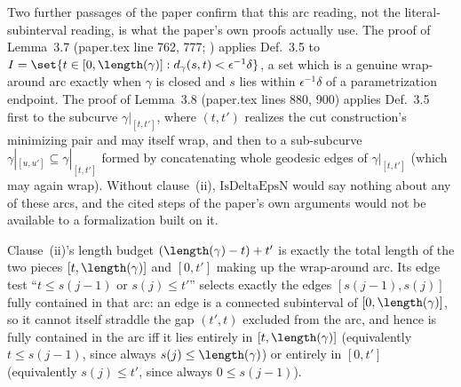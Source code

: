 \begin{definition}
  Two further passages of the paper confirm that this arc reading, not the literal-subinterval
  reading, is what the paper's own proofs actually use. The proof of Lemma~3.7 (paper.tex line 762,
  777; ) applies Def.~3.5 to $I = \set{t\in[0,\length(\gamma)] :
  d_\gamma(s,t) < \epsilon^{-1}\delta}$, a set which is a genuine wrap-around arc exactly when
  $\gamma$ is closed and $s$ lies within $\epsilon^{-1}\delta$ of a parametrization endpoint. The
  proof of Lemma~3.8 (paper.tex lines 880, 900) applies Def.~3.5 first to the subcurve
  $\gamma|_{[t,t']}$, where $(t,t')$ realizes the cut construction's minimizing pair and may itself
  wrap, and then to a sub-subcurve $\gamma|_{[u,u']}\subseteq\gamma|_{[t,t']}$ formed by
  concatenating whole geodesic edges of $\gamma|_{[t,t']}$ (which may again wrap). Without
  clause~(ii), $\mathrm{IsDeltaEpsN}$ would say nothing about any of these arcs, and the cited
  steps of the paper's own arguments would not be available to a formalization built on it.

  Clause~(ii)'s length budget $(\length(\gamma)-t)+t'$ is exactly the total length of the two
  pieces $[t,\length(\gamma)]$ and $[0,t']$ making up the wrap-around arc. Its edge test
  ``$t \leq s(j-1)$ or $s(j) \leq t'$'' selects exactly the edges $[s(j-1),s(j)]$ fully contained
  in that arc: an edge is a connected subinterval of $[0,\length(\gamma)]$, so it cannot itself
  straddle the gap $(t',t)$ excluded from the arc, and hence is fully contained in the arc iff it
  lies entirely in $[t,\length(\gamma)]$ (equivalently $t \leq s(j-1)$, since always $s(j) \leq
  \length(\gamma)$) or entirely in $[0,t']$ (equivalently $s(j) \leq t'$, since always $0 \leq
  s(j-1)$).


\end{definition}
